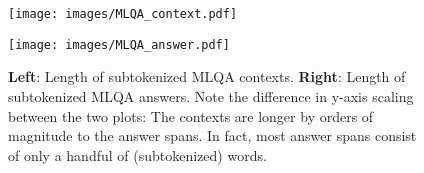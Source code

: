 \begin{figure}
  \label{fig:mlqa-stats}
  \begin{minipage}{0.45\linewidth}
  \vspace{0pt}
    \texttt{[image: images/MLQA\_context.pdf]}
  \end{minipage}
  \hfill
  \begin{minipage}{0.45\linewidth}
  \vspace{0pt}
    \texttt{[image: images/MLQA\_answer.pdf]}
  \end{minipage}
  \caption[MLQA Lengths]{\textbf{Left}: Length of subtokenized MLQA contexts.
                         \textbf{Right}: Length of subtokenized MLQA answers. Note the difference in y-axis scaling between the two plots:
                         The contexts are longer by orders of magnitude to the answer spans. In fact, most answer spans consist of only a handful of
                         (subtokenized) words.}
\end{figure}







